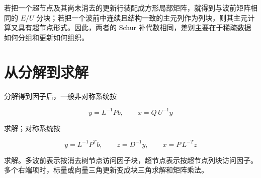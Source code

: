 若把一个超节点及其尚未消去的更新行装配成方形局部矩阵，就得到与波前矩阵相同的 $E/U$ 分块；若把一个波前中连续且结构一致的主元列作为列块，则其主元计算又具有超节点形式。因此，两者的 Schur 补代数相同，差别主要在于稀疏数据如何分组和更新如何组织。

\section{从分解到求解}

分解得到因子后，一般非对称系统按

\[
y=L^{-1}Pb,\qquad x=Q\,U^{-1}y
\]

求解；对称系统按

\[
y=L^{-1}P^Tb,\qquad z=D^{-1}y,
\qquad x=P\,L^{-T}z
\]

求解。多波前表示按消去树节点访问因子块，超节点表示按超节点列块访问因子。多个右端项时，标量或向量三角更新变成块三角求解和矩阵乘法。
